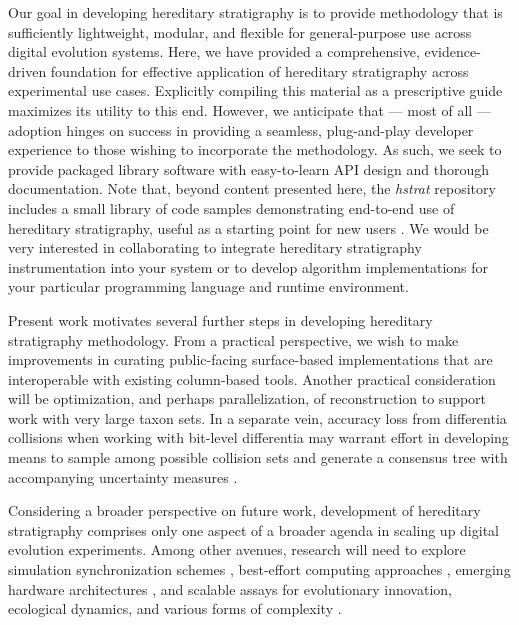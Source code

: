 Our goal in developing hereditary stratigraphy is to provide methodology that is sufficiently lightweight, modular, and flexible for general-purpose use across digital evolution systems.
Here, we have provided a comprehensive, evidence-driven foundation for effective application of hereditary stratigraphy across experimental use cases.
Explicitly compiling this material as a prescriptive guide maximizes its utility to this end.
However, we anticipate that --- most of all --- adoption hinges on success in providing a seamless, plug-and-play developer experience to those wishing to incorporate the methodology.
As such, we seek to provide packaged library software with easy-to-learn API design and thorough documentation.
Note that, beyond content presented here, the \textit{hstrat} repository includes a small library of code samples demonstrating end-to-end use of hereditary stratigraphy, useful as a starting point for new users \citep{moreno2022hstrat}.
We would be very interested in collaborating to integrate hereditary stratigraphy instrumentation into your system or to develop algorithm implementations for your particular programming language and runtime environment.

Present work motivates several further steps in developing hereditary stratigraphy methodology.
From a practical perspective, we wish to make improvements in curating public-facing surface-based implementations that are interoperable with existing column-based tools.
Another practical consideration will be optimization, and perhaps parallelization, of reconstruction to support work with very large taxon sets.
In a separate vein, accuracy loss from differentia collisions when working with bit-level differentia may warrant effort in developing means to sample among possible collision sets and generate a consensus tree with accompanying uncertainty measures \citep{bryant2003classification}.

Considering a broader perspective on future work, development of hereditary stratigraphy comprises only one aspect of a broader agenda in scaling up digital evolution experiments.
Among other avenues, research will need to explore simulation synchronization schemes \citep{fujimoto1990parallel}, best-effort computing approaches \citep{moreno2022best,ackley2020best}, emerging hardware architectures \citep{moreno2024trackable,chan2018lenia,heinemann2008artificial}, and scalable assays for evolutionary innovation, ecological dynamics, and various forms of complexity \citep{bedau1998classification,dolson2019modes,moreno2024methods,moreno2024case,moreno2024ecology}.
